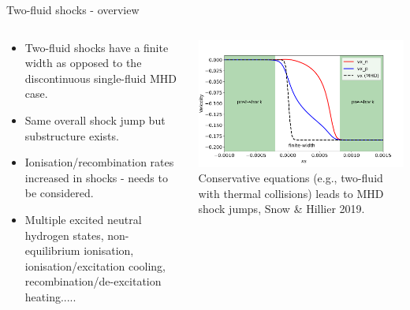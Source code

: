 \documentclass[10pt,aspectratio=169,usenames,dvipsnames]{beamer}
\begin{document}
\begin{frame}{Two-fluid shocks - overview}
\begin{columns}
\begin{column}{0.4\textwidth}
\begin{itemize}
    \item Two-fluid shocks have a finite width as opposed to the discontinuous single-fluid MHD case.
    \item Same overall shock jump but substructure exists.
    \item Ionisation/recombination rates increased in shocks - needs to be considered.
    \item Multiple excited neutral hydrogen states, non-equilibrium ionisation, ionisation/excitation cooling, recombination/de-excitation heating..... 
\end{itemize}
\end{column}
\begin{column}{0.6\textwidth}
\includegraphics[width=0.95\linewidth]{2023RAS/Figures/shocksub_col.png} \\
Conservative equations (e.g., two-fluid with thermal collisions) leads to MHD shock jumps, Snow \& Hillier 2019.
\end{column}
\end{columns}
\end{frame}
\end{document}
